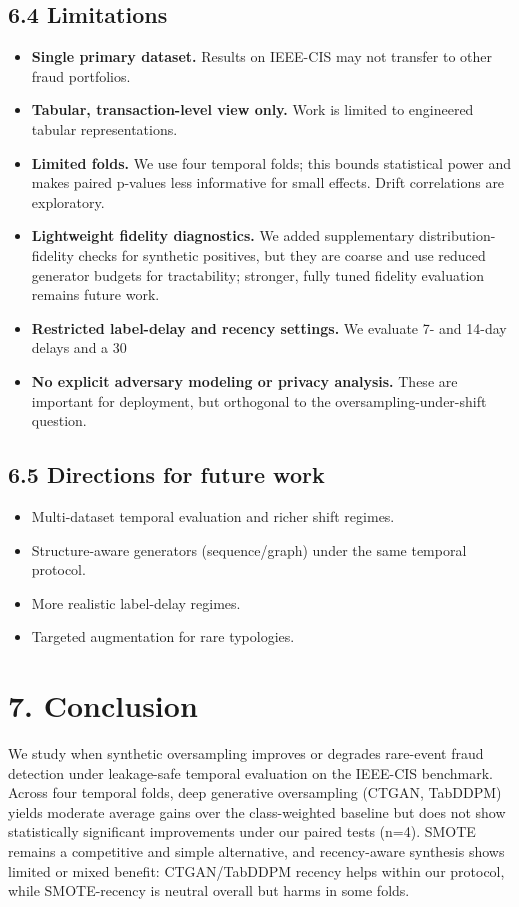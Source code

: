 \documentclass[sigconf]{acmart}
\begin{document}
{{{{{{{{\subsection{6.4 Limitations}

\begin{itemize}
\item \textbf{Single primary dataset.} Results on IEEE-CIS may not transfer to other fraud portfolios.
\item \textbf{Tabular, transaction-level view only.} Work is limited to engineered tabular representations.
\item \textbf{Limited folds.} We use four temporal folds; this bounds statistical power and makes paired p-values less informative for small effects. Drift correlations are exploratory.
\item \textbf{Lightweight fidelity diagnostics.} We added supplementary distribution-fidelity checks for synthetic positives, but they are coarse and use reduced generator budgets for tractability; stronger, fully tuned fidelity evaluation remains future work.
\item \textbf{Restricted label-delay and recency settings.} We evaluate 7- and 14-day delays and a 30%
\item \textbf{No explicit adversary modeling or privacy analysis.} These are important for deployment, but orthogonal to the oversampling-under-shift question.

\end{itemize}
\subsection{6.5 Directions for future work}

\begin{itemize}
\item Multi-dataset temporal evaluation and richer shift regimes.
\item Structure-aware generators (sequence/graph) under the same temporal protocol.
\item More realistic label-delay regimes.
\item Targeted augmentation for rare typologies.


\end{itemize}
\section{7. Conclusion}

We study when synthetic oversampling improves or degrades rare-event fraud detection under leakage-safe temporal evaluation on the IEEE-CIS benchmark. Across four temporal folds, deep generative oversampling (CTGAN, TabDDPM) yields moderate average gains over the class-weighted baseline but does not show statistically significant improvements under our paired tests (n=4). SMOTE remains a competitive and simple alternative, and recency-aware synthesis shows limited or mixed benefit: CTGAN/TabDDPM recency helps within our protocol, while SMOTE-recency is neutral overall but harms in some folds.

}}}}}}}}
\end{document}

